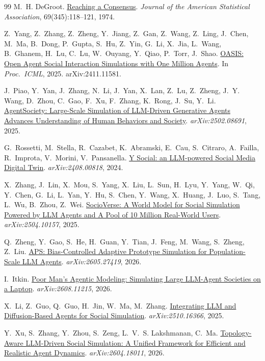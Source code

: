 \documentclass[twocolumn,10pt]{article}
\makeatletter
\newcommand{\paperurlof}[1]{\csname paperurl@#1\endcsname}
\newcommand{\reftitle}[2]{\href{\paperurlof{#1}}{#2}}
\makeatother
\begin{document}
\begin{thebibliography}{99}
M.~H. DeGroot.
\newblock \reftitle{degroot1974}{Reaching a
Consensus}.
\newblock \emph{Journal of the American Statistical Association},
69(345):118--121, 1974.

Z.~Yang, Z.~Zhang, Z.~Zheng, Y.~Jiang, Z.~Gan, Z.~Wang, Z.~Ling, J.~Chen,
M.~Ma, B.~Dong, P.~Gupta, S.~Hu, Z.~Yin, G.~Li, X.~Jia, L.~Wang, B.~Ghanem,
H.~Lu, C.~Lu, W.~Ouyang, Y.~Qiao, P.~Torr, J.~Shao.
\newblock \reftitle{oasis}{OASIS: Open Agent Social Interaction Simulations
with One Million Agents}.
\newblock In \emph{Proc.\ ICML}, 2025. arXiv:2411.11581.

J.~Piao, Y.~Yan, J.~Zhang, N.~Li, J.~Yan, X.~Lan, Z.~Lu, Z.~Zheng, J.~Y. Wang,
D.~Zhou, C.~Gao, F.~Xu, F.~Zhang, K.~Rong, J.~Su, Y.~Li.
\newblock \reftitle{agentsociety}{AgentSociety: Large-Scale Simulation of
LLM-Driven Generative Agents Advances Understanding of Human Behaviors and
Society}.
\newblock \emph{arXiv:2502.08691}, 2025.

G.~Rossetti, M.~Stella, R.~Cazabet, K.~Abramski, E.~Cau, S.~Citraro,
A.~Failla, R.~Improta, V.~Morini, V.~Pansanella.
\newblock \reftitle{ysocial}{Y Social: an LLM-powered Social Media Digital
Twin}.
\newblock \emph{arXiv:2408.00818}, 2024.

X.~Zhang, J.~Lin, X.~Mou, S.~Yang, X.~Liu, L.~Sun, H.~Lyu, Y.~Yang, W.~Qi,
Y.~Chen, G.~Li, L.~Yan, Y.~Hu, S.~Chen, Y.~Wang, X.~Huang, J.~Luo, S.~Tang,
L.~Wu, B.~Zhou, Z.~Wei.
\newblock \reftitle{socioverse}{SocioVerse: A World Model for Social
Simulation Powered by LLM Agents and A Pool of 10 Million Real-World Users}.
\newblock \emph{arXiv:2504.10157}, 2025.

Q.~Zheng, Y.~Gao, S.~He, H.~Guan, Y.~Tian, J.~Feng, M.~Wang, S.~Zheng,
Z.~Liu.
\newblock \reftitle{aps}{APS: Bias-Controlled Adaptive Prototype Simulation
for Population-Scale LLM Agents}.
\newblock \emph{arXiv:2605.27419}, 2026.

I.~Itkin.
\newblock \reftitle{poorman}{Poor Man's Agentic Modeling: Simulating Large
LLM-Agent Societies on a Laptop}.
\newblock \emph{arXiv:2608.11215}, 2026.

X.~Li, Z.~Guo, Q.~Guo, H.~Jin, W.~Ma, M.~Zhang.
\newblock \reftitle{hybriddiffusion}{Integrating LLM and Diffusion-Based
Agents for Social Simulation}.
\newblock \emph{arXiv:2510.16366}, 2025.

Y.~Xu, S.~Zhang, Y.~Zhou, S.~Zeng, L.~V.~S. Lakshmanan, C.~Ma.
\newblock \reftitle{toposim}{Topology-Aware LLM-Driven Social Simulation: A
Unified Framework for Efficient and Realistic Agent Dynamics}.
\newblock \emph{arXiv:2604.18011}, 2026.


\end{thebibliography}
\end{document}
